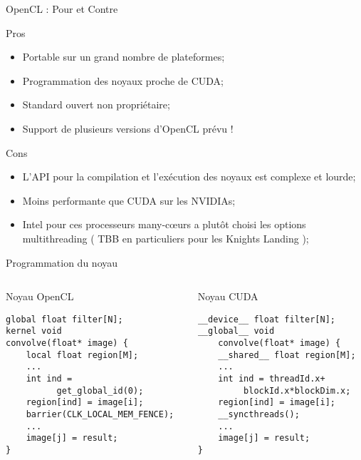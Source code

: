 \documentclass[handout,francais]{beamer}
\begin{document}
\begin{frame}[fragile]{OpenCL : Pour et Contre}
\begin{exampleblock}{Pros}
\begin{itemize}
\item Portable sur un grand nombre de plateformes;
\item Programmation des noyaux proche de CUDA;
\item Standard ouvert non propriétaire;
\item Support de plusieurs versions d'OpenCL prévu !
\end{itemize}
\end{exampleblock}

\begin{alertblock}{Cons}
\begin{itemize}
\item L'API pour la compilation et l'exécution des noyaux est complexe et lourde;
\item Moins performante que CUDA sur les NVIDIAs;
\item Intel pour ces processeurs many-c{\oe}urs a plutôt choisi les options
      multithreading ( TBB en particuliers pour les Knights Landing );
\end{itemize}
\end{alertblock}
\end{frame}

\begin{frame}[fragile]{Programmation du noyau}

\begin{columns}
  \begin{column}{0.5\textwidth}
  \begin{exampleblock}{Noyau OpenCL}
{\scriptsize
\begin{lstlisting}
global float filter[N];
kernel void 
convolve(float* image) {
    local float region[M];
    ...
    int ind = 
          get_global_id(0);
    region[ind] = image[i];
    barrier(CLK_LOCAL_MEM_FENCE);
    ...
    image[j] = result;
}
\end{lstlisting}
}
  \end{exampleblock}
  \end{column}
  \begin{column}{0.5\textwidth}
  \begin{alertblock}{Noyau CUDA}
{\scriptsize
\begin{lstlisting}
__device__ float filter[N];
__global__ void  
    convolve(float* image) {
    __shared__ float region[M];
    ...
    int ind = threadId.x+
         blockId.x*blockDim.x;
    region[ind] = image[i];
    __syncthreads();
    ...
    image[j] = result;
}
\end{lstlisting}
}
  \end{alertblock}
  \end{column}
\end{columns}
\end{frame}
\end{document}
